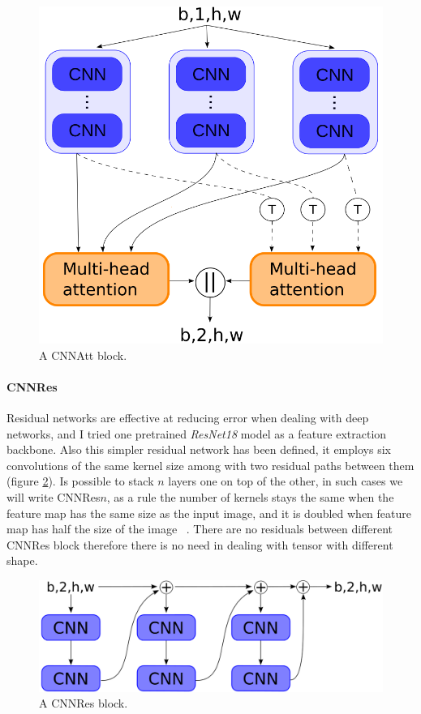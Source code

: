 \documentclass{article}
\begin{document}
\begin{figure}
    \centering
    \includegraphics[scale=.3]{images/cnn_att.png}
    \caption{A CNNAtt block.}
    \label{fig:cnnatt}
\end{figure}

\paragraph*{CNNRes}
Residual networks are effective at reducing error when dealing with deep networks, and I tried one pretrained \textit{ResNet18} model as a feature extraction backbone.
Also this simpler residual network has been defined, it employs six convolutions of the same kernel size among with two residual paths between them (figure \ref{fig:cnnres}).
Is possible to stack $n$ layers one on top of the other, in such cases we will write CNNRes$n$, as a rule the number of kernels stays the same when the feature map has the same size as the input image, and it is doubled when feature map has half the size of the image ~\cite{he2016deep}.
There are no residuals between different CNNRes block therefore there is no need in dealing with tensor with different shape. 

\begin{figure}
    \centering
    \includegraphics[scale=.25]{images/cnn_res.png}
    \caption{A CNNRes block.}
    \label{fig:cnnres}
\end{figure}
\end{document}
